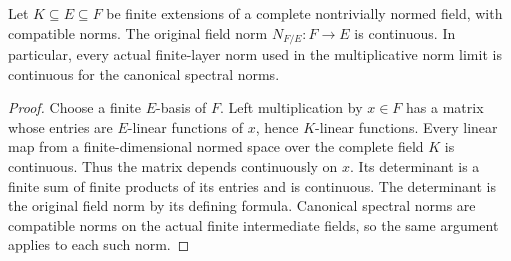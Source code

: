 \begin{lemma}
\label{fw:finite-norm-continuity}
\leanok
Let $K\subseteq E\subseteq F$ be finite extensions of a complete
nontrivially normed field, with compatible norms. The original
field norm $N_{F/E}:F\longrightarrow E$ is continuous.
In particular, every actual finite-layer norm used in the
multiplicative norm limit is continuous for the canonical spectral norms.
\end{lemma}
\begin{proof}
Choose a finite $E$-basis of $F$. Left multiplication by $x\in F$
has a matrix whose entries are $E$-linear functions of $x$, hence
$K$-linear functions. Every linear map from a finite-dimensional
normed space over the complete field $K$ is continuous.
Thus the matrix depends continuously on $x$. Its determinant is a
finite sum of finite products of its entries and is continuous.
The determinant is the original field norm by its defining formula.
Canonical spectral norms are compatible norms on the actual finite
intermediate fields, so the same argument applies to each such norm.
\end{proof}

